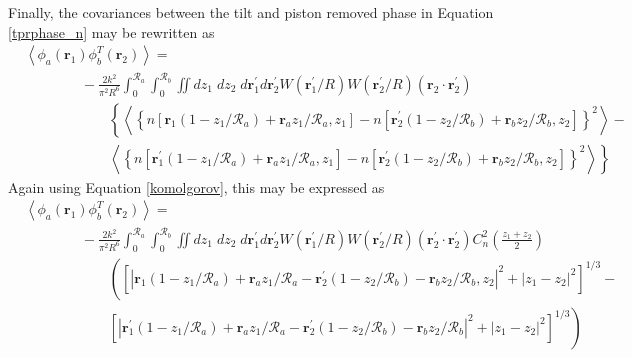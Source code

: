 Finally, the covariances between the tilt and piston removed phase in Equation \ref{tprphase_n} may be rewritten as 
\begin{equation}\label{tprphase_n2}
\begin{aligned}
&\left\langle \phi_{a}\left(\boldsymbol{r}_{1}\right) \phi^{T}_{b}\left(\boldsymbol{r}_{2}\right)\right\rangle = \\
&\quad\quad\quad\quad
-\frac{2k^{2}}{\pi^{2}R^{6}} \int_{0}^{\mathcal{R}_{a}}  \int_{0}^{\mathcal{R}_{b}} \iint dz_{1} \; dz_{2} \; d\boldsymbol{r}^{\prime}_{1}d\boldsymbol{r}^{\prime}_{2} W(\boldsymbol{r}^{\prime}_{1}/R) W(\boldsymbol{r}^{\prime}_{2}/R)
\left(\boldsymbol{r}_{2} \cdot \boldsymbol{r}^{\prime}_{2}\right)
\\
&\quad\quad\quad\quad\quad\quad
\left\{
\left\langle \left\{n\left[\boldsymbol{r}_{1}\left(1-z_{1}/\mathcal{R}_{a}\right) + \boldsymbol{r}_{a} z_{1}/\mathcal{R}_{a}, z_{1}\right] -
 n\left[\boldsymbol{r}^{\prime}_{2}\left(1-z_{2}/\mathcal{R}_{b}\right) + \boldsymbol{r}_{b} z_{2}/\mathcal{R}_{b}, z_{2}\right] \right\}^{2}\right\rangle 
\right. -
\\
&\quad\quad\quad\quad\quad\quad
\left.
\left\langle \left\{ n\left[\boldsymbol{r}^{\prime}_{1}\left(1-z_{1}/\mathcal{R}_{a}\right) + \boldsymbol{r}_{a} z_{1}/\mathcal{R}_{a}, z_{1}\right]- 
 n\left[\boldsymbol{r}^{\prime}_{2}\left(1-z_{2}/\mathcal{R}_{b}\right) + \boldsymbol{r}_{b} z_{2}/\mathcal{R}_{b}, z_{2}\right] \right\}^{2}\right\rangle
\right\}
\end{aligned}
\end{equation}
Again using Equation \ref{komolgorov}, this may be expressed as
\begin{equation}\label{tprphase_n3}
\begin{aligned}
&\left\langle \phi_{a}\left(\boldsymbol{r}_{1}\right) \phi^{T}_{b}\left(\boldsymbol{r}_{2}\right)\right\rangle = \\
&\quad\quad\quad\quad
-\frac{2k^{2}}{\pi^{2}R^{6}} \int_{0}^{\mathcal{R}_{a}}  \int_{0}^{\mathcal{R}_{b}} \iint dz_{1} \; dz_{2} \; d\boldsymbol{r}^{\prime}_{1}d\boldsymbol{r}^{\prime}_{2} W(\boldsymbol{r}^{\prime}_{1}/R) W(\boldsymbol{r}^{\prime}_{2}/R)
\left(\boldsymbol{r}^{\prime}_{2} \cdot \boldsymbol{r}^{\prime}_{2}\right)
C_{n}^{2}\left(\frac{z_{1} + z_{2}}{2}\right) 
\\
&\quad\quad\quad\quad\quad\quad
\left(
\left[\left\vert \boldsymbol{r}_{1}\left(1-z_{1}/\mathcal{R}_{a}\right) + \boldsymbol{r}_{a} z_{1}/\mathcal{R}_{a} - \boldsymbol{r}^{\prime}_{2}\left(1-z_{2}/\mathcal{R}_{b}\right) - \boldsymbol{r}_{b} z_{2}/\mathcal{R}_{b}, z_{2}\right\vert^{2}   + 
\left\vert z_{1} - z_{2} \right\vert^{2}\right]^{1/3}
\right. -
\\
&\quad\quad\quad\quad\quad\quad
\left.
\left[ \left\vert \boldsymbol{r}^{\prime}_{1}\left(1-z_{1}/\mathcal{R}_{a}\right) + \boldsymbol{r}_{a} z_{1}/\mathcal{R}_{a} - 
 \boldsymbol{r}^{\prime}_{2}\left(1-z_{2}/\mathcal{R}_{b}\right) - \boldsymbol{r}_{b} z_{2}/\mathcal{R}_{b}\right\vert^{2} + 
\left\vert z_{1} - z_{2} \right\vert^{2}\right]^{1/3}
\right)
\end{aligned}
\end{equation}

